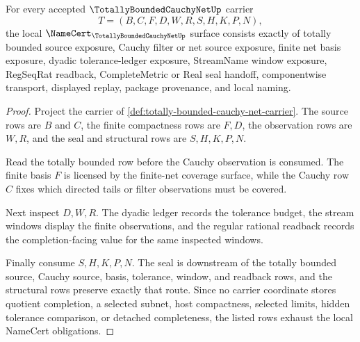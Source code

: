 \begin{theorem}
\label{thm:totally-bounded-cauchy-net-namecert-obligations}
For every accepted $\TotallyBoundedCauchyNetUp$ carrier
$$
T=(B,C,F,D,W,R,S,H,K,P,N),
$$
the local $\NameCert_{\TotallyBoundedCauchyNetUp}$ surface consists exactly of totally bounded source exposure, Cauchy filter or net source exposure, finite net basis exposure, dyadic tolerance-ledger exposure, StreamName window exposure, RegSeqRat readback, CompleteMetric or Real seal handoff, componentwise transport, displayed replay, package provenance, and local naming.
\end{theorem}
\begin{proof}
Project the carrier of \autoref{def:totally-bounded-cauchy-net-carrier}. The source rows are $B$ and $C$, the finite compactness rows are $F,D$, the observation rows are $W,R$, and the seal and structural rows are $S,H,K,P,N$.

Read the totally bounded row before the Cauchy observation is consumed. The finite basis $F$ is licensed by the finite-net coverage surface, while the Cauchy row $C$ fixes which directed tails or filter observations must be covered.

Next inspect $D,W,R$. The dyadic ledger records the tolerance budget, the stream windows display the finite observations, and the regular rational readback records the completion-facing value for the same inspected windows.

Finally consume $S,H,K,P,N$. The seal is downstream of the totally bounded source, Cauchy source, basis, tolerance, window, and readback rows, and the structural rows preserve exactly that route. Since no carrier coordinate stores quotient completion, a selected subnet, host compactness, selected limits, hidden tolerance comparison, or detached completeness, the listed rows exhaust the local NameCert obligations.
\end{proof}

